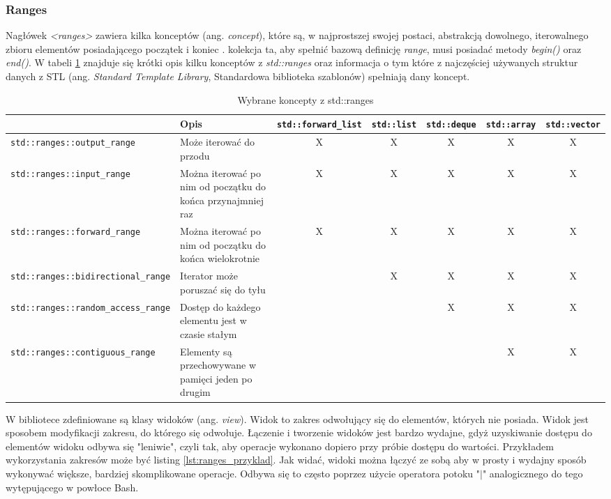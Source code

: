 \documentclass[a4paper,12pt]{book} %
\begin{document}
\subsubsection{Ranges}
Nagłówek \emph{<ranges>} zawiera kilka konceptów (ang. \emph{concept}), które są, w najprostszej swojej postaci, abstrakcją dowolnego, iterowalnego zbioru elementów posiadającego początek i koniec \cite{ranges}. kolekcja ta, aby spełnić bazową definicję \emph{range}, musi posiadać metody \emph{begin()} oraz \emph{end()}. W tabeli \ref{ranges_concepts} znajduje się krótki opis kilku konceptów z \emph{std::ranges} oraz informacja o tym które z najczęściej używanych struktur danych z STL (ang. \emph{Standard Template Library}, Standardowa biblioteka szablonów) spełniają dany koncept.
\begin{table}[H]
\begin{adjustbox}{max width=\textheight, angle=90, center}
\begin{tabular}{|l|m{7cm}|ccccc|}
\hline
	& Opis & \texttt{std::forward\_list} & \texttt{std::list} & \texttt{std::deque} & \texttt{std::array} & \texttt{std::vector} \\
\hline
\texttt{std::ranges::output\_range} & Może iterować do przodu & X & X & X & X & X \\
\hline
\texttt{std::ranges::input\_range} & Można iterować po nim od początku do końca przynajmniej raz & X & X & X & X & X \\
\hline
\texttt{std::ranges::forward\_range} & Można iterować po nim od początku do końca wielokrotnie & X & X & X & X & X \\
\hline
\texttt{std::ranges::bidirectional\_range} & Iterator może poruszać się do tyłu & & X & X & X & X \\
\hline
\texttt{std::ranges::random\_access\_range} & Dostęp do każdego elementu jest w czasie stałym & & & X & X & X \\
\hline
\texttt{std::ranges::contiguous\_range} & Elementy są przechowywane w pamięci jeden po drugim & & & & X & X \\
\hline
\end{tabular}
\end{adjustbox}
\caption{Wybrane koncepty z std::ranges}
\label{ranges_concepts}
\end{table}
W bibliotece zdefiniowane są klasy widoków (ang. \emph{view}). Widok to zakres odwołujący się do elementów, których nie posiada. Widok jest sposobem modyfikacji zakresu, do którego się odwołuje. Łączenie i tworzenie widoków jest bardzo wydajne, gdyż uzyskiwanie dostępu do elementów widoku odbywa się "leniwie", czyli tak, aby operacje wykonano dopiero przy próbie dostępu do wartości. Przykładem wykorzystania zakresów może być listing \ref{lst:ranges_przyklad}. Jak widać, widoki można łączyć ze sobą aby w prosty i wydajny sposób wykonywać większe, bardziej skomplikowane operacje. Odbywa się to często poprzez użycie operatora potoku "$|$" analogicznego do tego wytępującego w powłoce Bash.
\end{document}
